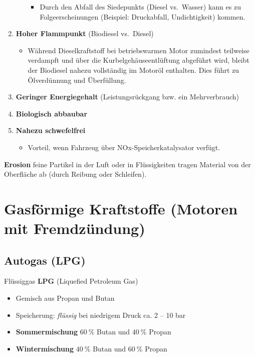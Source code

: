 \begin{enumerate}
\begin{itemize}
    \begin{itemize}
    \item
      Durch den Abfall des Siedepunkts (Diesel vs.~Wasser) kann es zu
      Folgeerscheinungen (Beispiel: Druckabfall, Undichtigkeit) kommen.
    \end{itemize}
  \end{itemize}
\item
  \textbf{Hoher Flammpunkt} (Biodiesel vs.~Diesel)

  \begin{itemize}
  \item
    Während Dieselkraftstoff bei betriebswarmen Motor zumindest
    teilweise verdampft und über die Kurbelgehäuseentlüftung abgeführt
    wird, bleibt der Biodiesel nahezu vollständig im Motoröl enthalten.
    Dies führt zu Ölverdünnung und Überfüllung.
  \end{itemize}
\item
  \textbf{Geringer Energiegehalt} (Leistungsrückgang bzw. ein
  Mehrverbrauch)
\item
  \textbf{Biologisch abbaubar}
\item
  \textbf{Nahezu schwefelfrei}

  \begin{itemize}
  \item
    Vorteil, wenn Fahrzeug über NOx-Speicherkatalysator verfügt.
  \end{itemize}
\end{enumerate}

\textbf{Erosion} feine Partikel in der Luft oder in Flüssigkeiten tragen
Material von der Oberfläche ab (durch Reibung oder Schleifen).

\section{Gasförmige Kraftstoffe (Motoren mit
Fremdzündung)}\label{gasfoermige-kraftstoffe-motoren-mit-fremdzuendung}

\subsection{Autogas (LPG)}\label{autogas-lpg}

Flüssiggas \textbf{LPG} (Liquefied Petroleum Gas)

\begin{itemize}
\item
  Gemisch aus Propan und Butan
\item
  Speicherung: \emph{flüssig} bei niedrigem Druck ca. 2 -- 10 bar
\item
  \textbf{Sommermischung} $60~\%$ Butan und $40~\%$ Propan
\item
  \textbf{Wintermischung} $40~\%$ Butan und $60~\%$ Propan
\end{itemize}

